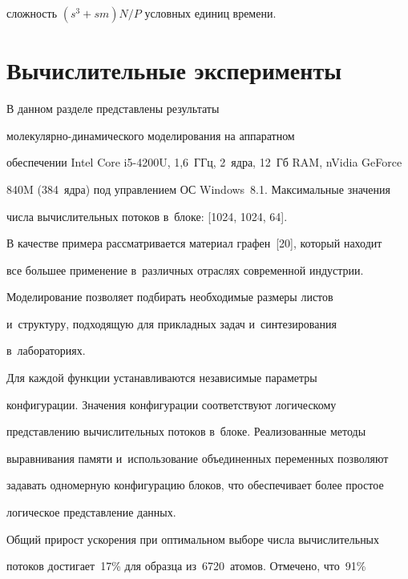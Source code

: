 сложность $(s^3+sm){N}/{P}$ условных единиц времени.



\vspace*{-6pt}

  

  \section{Вычислительные эксперименты}

  

  \vspace*{-2pt}

  

  В данном разделе представлены результаты  

мо\-ле\-ку\-ляр\-но-ди\-на\-ми\-че\-ско\-го моделирования на аппаратном 

обеспечении Intel Core i5-4200U, 1,6~ГГц, 2~ядра, 12~Гб RAM, nVidia GeForce 

840M (384~ядра) под управлением ОС Windows~8.1. Максимальные значения 

числа вычислительных потоков в~блоке: [1024, 1024, 64]. 

  

  В качестве примера рассматривается материал графен~[20], который находит 

все большее применение в~различных отраслях современной индустрии. 

Моделирование позволяет подбирать необходимые размеры листов 

и~структуру, подходящую для прикладных задач и~синтезирования 

в~лабораториях. 

  

  Для каждой функции устанавливаются независимые параметры 

конфигурации. Значения конфигурации соответствуют логическому 

представлению вычислительных потоков в~блоке. Реализованные методы 

выравнивания памяти и~использование объединенных переменных позволяют 

задавать одномерную конфигурацию блоков, что обеспечивает более простое 

логическое представление данных.

  

  Общий прирост ускорения при оптимальном выборе числа вычислительных 

потоков достигает~17\% для образца из~6720~атомов. Отмечено, что~91\% 

